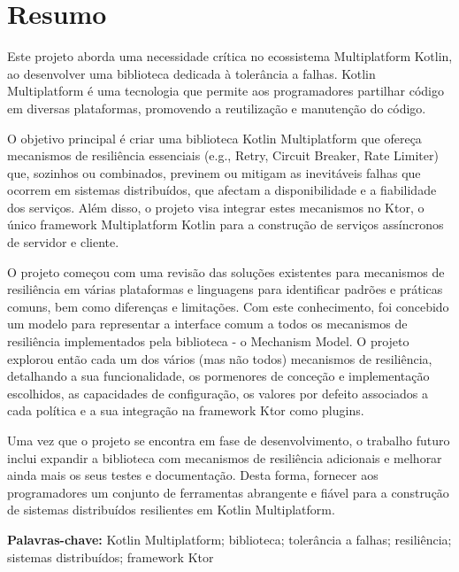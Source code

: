 \chapter*{Resumo}\label{ch:resumo}

Este projeto aborda uma necessidade crítica no ecossistema Multiplatform Kotlin,
ao desenvolver uma biblioteca dedicada à tolerância a falhas.
Kotlin Multiplatform é uma tecnologia que permite aos programadores partilhar código em diversas plataformas, promovendo a reutilização e manutenção do código.

O objetivo principal é
criar uma biblioteca Kotlin Multiplatform
que ofereça mecanismos de resiliência essenciais (e.g., Retry, Circuit Breaker, Rate Limiter)
que, sozinhos ou combinados, previnem ou mitigam as inevitáveis falhas que
ocorrem em sistemas distribuídos,
que afectam a disponibilidade e a fiabilidade dos serviços.
Além disso, o projeto visa integrar estes mecanismos no Ktor,
o único framework Multiplatform Kotlin para a construção de serviços assíncronos de servidor e cliente.

O projeto começou com uma revisão das soluções existentes para mecanismos de resiliência em várias plataformas e linguagens
para identificar padrões e práticas comuns, bem como diferenças e limitações.
Com este conhecimento,
foi concebido um modelo para representar a interface comum a todos os mecanismos de resiliência implementados pela biblioteca - o Mechanism Model.
O projeto explorou então cada um dos
vários (mas não todos) mecanismos de resiliência,
detalhando a sua funcionalidade,
os pormenores de conceção e implementação escolhidos, as capacidades de configuração, os valores por defeito associados a cada política e a sua integração na framework Ktor como plugins.

Uma vez que o projeto se encontra em fase de desenvolvimento, o trabalho futuro inclui
expandir a biblioteca com mecanismos de resiliência adicionais
e melhorar ainda mais os seus testes e documentação.
Desta forma, fornecer aos programadores um conjunto de ferramentas abrangente e fiável para a construção de sistemas distribuídos resilientes
em Kotlin Multiplatform.

\textbf{Palavras-chave:} Kotlin Multiplatform; biblioteca; tolerância a falhas; resiliência; sistemas distribuídos; framework Ktor

